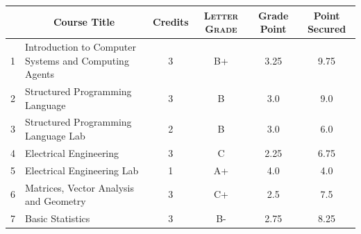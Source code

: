 \documentclass[11pt]{article}
\newcommand*{\numtwo}[1]{\pgfmathprintnumber[
                    fixed, precision=2, fixed zerofill=true]{#1}}
\begin{document}
                \begin{center}
                    \renewcommand{\arraystretch}{1.08}
                    
                \begin{tabular}{|c|l|c|>{\scshape}c|c|c|}
                \hline  \rule[-1ex]{0pt}{3.5ex} {\centering{\bf Course Code}} &  \multicolumn{1}{c|}{\textbf{Course Title}}  & {\bf Credits} & {\bf Letter Grade} & {\bf Grade Point} & {\bf Point Secured}  \\ 
                \hline   1 &  Introduction to Computer Systems and Computing Agents		 & 3 & B+ & 3.25 & 9.75 \\ %
                \hline   2 &  Structured Programming Language		 & 3 & B & 3.0 & 9.0 \\ %
                \hline   3 &  Structured Programming Language Lab		 & 2 & B & 3.0 & 6.0 \\ %
                \hline   4 &  Electrical Engineering		 & 3 & C & 2.25 & 6.75 \\ %
                \hline   5 &  Electrical Engineering Lab		 & 1 & A+ & 4.0 & 4.0 \\ %
                \hline   6 &  Matrices, Vector Analysis and Geometry		 & 3 & C+ & 2.5 & 7.5 \\ %
                \hline   7 &  Basic Statistics		 & 3 & B- & 2.75 & 8.25 \\ %

\hline                %
                \end{tabular}
                \end{center}
                \renewcommand{\arraystretch}{1.03}
\end{document}
